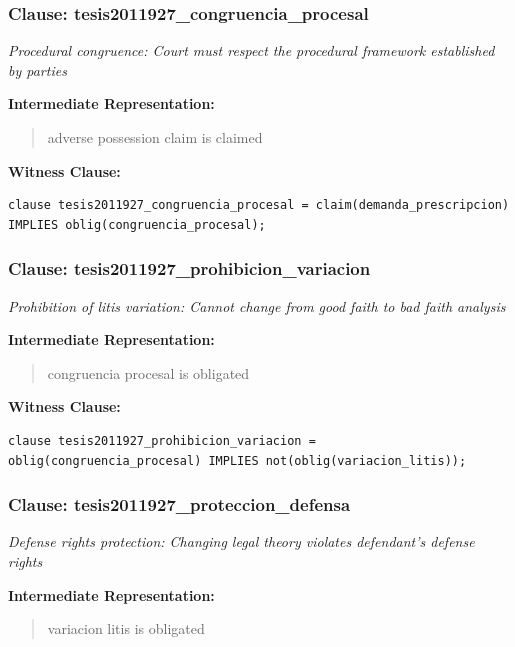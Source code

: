 \documentclass[11pt,a4paper]{article}
\begin{document}
\subsubsection{Clause: tesis2011927\_congruencia\_procesal}

\textit{Procedural congruence: Court must respect the procedural framework established by parties}

\textbf{Intermediate Representation:}

\begin{quote}
adverse possession claim is claimed
\end{quote}

\textbf{Witness Clause:}

\begin{lstlisting}[style=witnessstyle, language=Witness]
clause tesis2011927_congruencia_procesal = claim(demanda_prescripcion) IMPLIES oblig(congruencia_procesal);
\end{lstlisting}

\subsubsection{Clause: tesis2011927\_prohibicion\_variacion}

\textit{Prohibition of litis variation: Cannot change from good faith to bad faith analysis}

\textbf{Intermediate Representation:}

\begin{quote}
congruencia procesal is obligated
\end{quote}

\textbf{Witness Clause:}

\begin{lstlisting}[style=witnessstyle, language=Witness]
clause tesis2011927_prohibicion_variacion = oblig(congruencia_procesal) IMPLIES not(oblig(variacion_litis));
\end{lstlisting}

\subsubsection{Clause: tesis2011927\_proteccion\_defensa}

\textit{Defense rights protection: Changing legal theory violates defendant's defense rights}

\textbf{Intermediate Representation:}

\begin{quote}
variacion litis is obligated
\end{quote}
\end{document}

